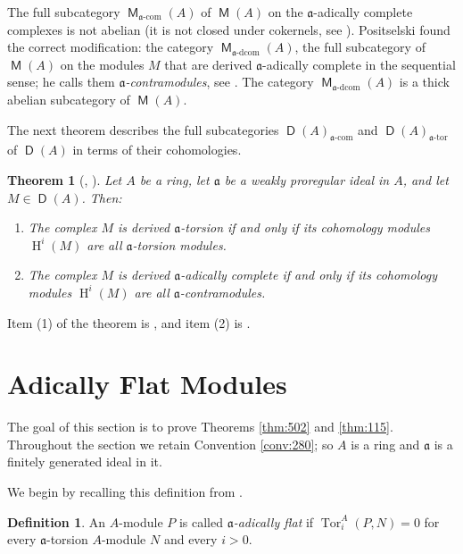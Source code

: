 \documentclass[10pt]{amsart}
\newtheorem{thm}[equation]{Theorem}
\theoremstyle{definition}
\newtheorem{dfn}[equation]{Definition}
\numberwithin{equation}{section}
\newcommand{\opn}{\operatorname}
\newcommand{\cat}[1]{\operatorname{\mathsf{#1}}}
\newcommand{\mfrak}[1]{\mathfrak{#1}}
\renewcommand{\a}{\mfrak{a}}
\newcommand{\tup}[1]{\textrm{#1}}
\begin{document}
The full subcategory $\cat{M}_{\tup{$\a$-com}}(A)$
of $\cat{M}(A)$ on the $\a$-adically
complete complexes is not abelian (it is not closed under cokernels, see
\cite[Example 3.20]{Ye1}). Positselski found the correct modification: the
category $\cat{M}_{\tup{$\a$-dcom}}(A)$, the full subcategory of
$\cat{M}(A)$ on the modules $M$ that are derived $\a$-adically complete in the
sequential sense; he calls them {\em $\a$-contramodules}, see
\cite[Section 1]{Po2}. The category
$\cat{M}_{\tup{$\a$-dcom}}(A)$
is a thick abelian subcategory of $\cat{M}(A)$.

The next theorem describes the full subcategories
$\cat{D}(A)_{\tup{$\a$-com}}$ and $\cat{D}(A)_{\tup{$\a$-tor}}$
of $\cat{D}(A)$ in terms of their cohomologies.

\begin{thm}[\cite{PSY1}, \cite{Po2}] \label{thm:276}
Let $A$ be a ring, let $\a$ be a weakly proregular ideal in $A$, and let
$M \in \cat{D}(A)$. Then:
\begin{enumerate}
\item The complex $M$ is derived $\a$-torsion if and only if its cohomology
modules $\opn{H}^i(M)$ are all $\a$-torsion modules.

\item The complex $M$ is derived $\a$-adically complete if and only if its
cohomology modules $\opn{H}^i(M)$ are all $\a$-contramodules.
\end{enumerate}
\end{thm}

Item (1) of the theorem is \cite[Corollary 4.3.2]{PSY1}, and item (2) is
\cite[Lemma 2.3]{Po1}.




\section{Adically Flat Modules}
\label{sec:ad-flat}

The goal of this section is to prove Theorems \ref{thm:502} and
\ref{thm:115}. Throughout the section we retain Convention \ref{conv:280};
so $A$ is a ring and $\a$ is a finitely generated ideal in it.

We begin by recalling this definition from \cite{Ye4}.

\begin{dfn} \label{dfn:260}
An $A$-module $P$ is called {\em $\a$-adically flat} if
$\opn{Tor}_i^A(P, N) = 0$ for every $\a$-torsion $A$-module $N$ and every
$i > 0$.
\end{dfn}
\end{document}
